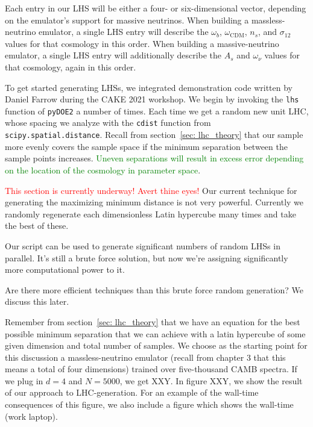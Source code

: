Each entry in our LHS will be either a four- or six-dimensional vector, 
depending on the emulator's support for massive neutrinos. When building a
massless-neutrino emulator, a single LHS entry will describe the $\omega_b$,
$\omega_\text{CDM}$, $n_s$, and $\sigma_{12}$ values for that cosmology in 
this order. When building a massive-neutrino emulator, a single LHS entry will 
additionally describe the $A_s$ and $\omega_\nu$ values for that cosmology, 
again in this order.

To get started generating LHSs, we integrated demonstration code written by 
Daniel Farrow  
during the CAKE 2021 workshop. We begin by invoking the \verb|lhs| function of
\verb|pyDOE2| a number of times. Each time we get a random new unit LHC, whose
spacing we analyze with the \verb|cdist| function from
\verb|scipy.spatial.distance|.  Recall from section~\ref{sec: lhc_theory} that
our sample more evenly covers the sample space if the minimum separation 
between the sample points increases. \textcolor{green}{Uneven separations will
result in excess error depending on the location of the cosmology in parameter
space}.

\textcolor{red}{This section is currently underway! Avert thine eyes!}
Our current technique for generating the  maximizing minimum distance is not very powerful.
Currently we randomly regenerate each dimensionless Latin hypercube many
times and take the best of these.

Our script can be used to generate significant numbers of random LHSs in
parallel. It’s still a brute force solution, but now we’re assigning
significantly more computational power to it.

Are there more efficient techniques than this brute force random generation?
We discuss this later. 

Remember from section~\ref{sec: lhc_theory} that we have an equation for the
best possible minimum separation that we can achieve with a latin hypercube
of some given dimension and total number of samples. We choose as the starting
point for this discussion a massless-neutrino emulator (recall from chapter 3
that this means a total of four dimensions) trained over five-thousand CAMB
spectra. If we plug in $d = 4$ and $N=5000$, we get XXY. In figure XXY, we
show the result of our approach to LHC-generation. For an example of the
wall-time consequences of this figure, we also include a figure which shows
the wall-time (work laptop).

